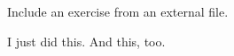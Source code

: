 \begin{exercise}
  Include an exercise from an external file.
  \begin{solution}[framed]
    I just did this.
    \pause
    And this, too.
  \end{solution}
\end{exercise}

